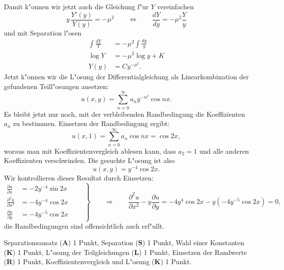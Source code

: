 \begin{loesung}
Damit k"onnen wir jetzt auch die Gleichung f"ur $Y$ vereinfachen
\[
y\, \frac{Y'(y)}{Y(y)}=-\mu^2
\qquad
\Leftrightarrow
\qquad
\frac{dY}{dy}=-\mu^2\frac{Y}{y}
\]
und mit Separation l"osen
\begin{align*}
\int\frac{dY}{Y}&=-\mu^2\int\frac{dy}y\\
\log Y&=-\mu^2\log y+K\\
Y(y)&=Cy^{-\mu^2}.
\end{align*}
Jetzt k"onnen wir die L"osung der Differentialgleichung als Linearkombination
der gefundenen Teill"osungen ansetzen:
\[
u(x,y)=\sum_{n=0}^\infty a_ny^{-n^2}\cos nx.
\]
Es bleibt jetzt nur noch, mit der verbleibenden Randbedingung die Koeffizienten
$a_n$ zu bestimmen. Einsetzen der Randbedingung ergibt:
\[
u(x,1)=\sum_{n=0}^\infty a_n\cos nx=\cos 2x,
\]
woraus man mit Koeffizientenvergleich ablesen kann,
dass $a_2=1$ und alle anderen Koeffizienten verschwinden.
Die gesuchte L"osung ist also
\[
u(x,y)=y^{-4}\cos 2x.
\]
Wir kontrollieren dieses Resultat durch Einsetzen:
\[
\left.
\begin{aligned}
\frac{\partial u}{\partial x}&=-2y^{-4}\sin 2x
\\
\frac{\partial^2 u}{\partial x^2}&=-4y^{-4}\cos 2x
\\
\frac{\partial u}{\partial y}&=-4y^{-5}\cos 2x
\end{aligned}\qquad
\right\}
\qquad
\Rightarrow
\qquad
\frac{\partial^2u}{\partial x^2}-y\frac{\partial u}{\partial y}=
-4y^4\cos 2x-y(-4y^{-5}\cos 2x)=0,
\]
die Randbedingungen sind offensichtlich auch erf"ullt.
\end{loesung}

\begin{bewertung}
Separationsansatz ({\bf A}) 1 Punkt,
Separation  ({\bf S}) 1 Punkt,
Wahl einer Konstanten ({\bf K}) 1 Punkt,
L"osung der Teilgleichungen ({\bf L}) 1 Punkt,
Einsetzen der Randwerte ({\bf R}) 1 Punkt,
Koeffizientenvergleich und L"osung ({\bf K}) 1 Punkt.
\end{bewertung}


